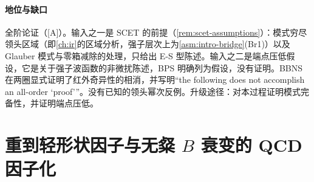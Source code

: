 \paragraph{地位与缺口}
全阶论证（[A]）。输入之一是 SCET 的前提（\cref{rem:scet-assumptions}）：模式穷尽领头区域（即\cref{ch:ir}的区域分析，强子层次上为\cref{asm:intro-bridge}(Br1)）以及 Glauber 模式与零箱减除的处理，只给出 E-S 型陈述。输入之二是端点压低假设，它是关于强子波函数的非微扰陈述，BPS 明确列为假设\cite{BauerPirjolStewart2001}，没有证明。BBNS 在两圈显式证明了红外奇异性的相消，并写明“the following does not accomplish an all-order ‘proof’”\cite[第~5~节]{BenekeEtAl2000}。没有已知的领头幂次反例。升级途径：对本过程证明模式完备性，并证明端点压低。

\section{重到轻形状因子与无粲 $B$ 衰变的 QCD 因子化}\label{sec:heavy-qcdf}


